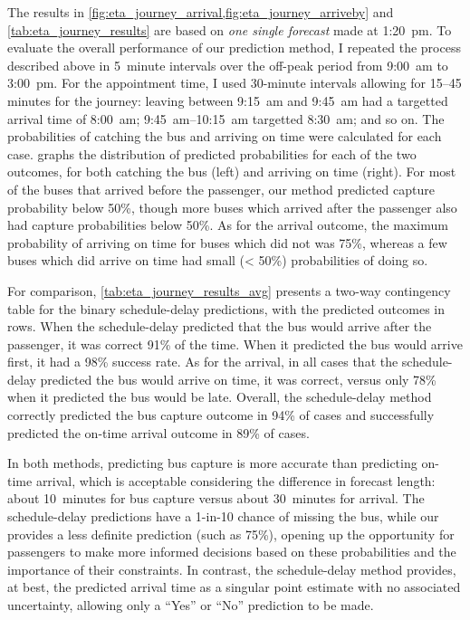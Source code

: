 The results in \cref{fig:eta_journey_arrival,fig:eta_journey_arriveby} and \cref{tab:eta_journey_results} are based on \emph{one single forecast} made at  1:20~pm. To evaluate the overall performance of our prediction method, I repeated the process described above in 5~minute intervals over the off-peak period from  9:00~am to  3:00~pm. For the appointment time, I used 30-minute intervals allowing for 15--45 minutes for the journey: leaving between 9:15~am and 9:45~am had a targetted arrival time of 8:00~am; 9:45~am--10:15~am targetted 8:30~am; and so on. The probabilities of catching the bus and arriving on time were calculated for each case.  graphs the distribution of predicted probabilities for each of the two outcomes, for both catching the bus (left) and arriving on time (right). For most of the buses that arrived before the passenger, our method predicted capture probability below 50\%, though more buses which arrived after the passenger also had capture probabilities below 50\%. As for the arrival outcome, the maximum probability of arriving on time for buses which did not was 75\%, whereas a few buses which did arrive on time had small (< 50\%) probabilities of doing so.


For comparison, \cref{tab:eta_journey_results_avg} presents a two-way contingency table for the binary schedule-delay predictions, with the predicted outcomes in rows. When the schedule-delay predicted that the bus would arrive after the passenger, it was correct 91\% of the time. When it predicted the bus would arrive first, it had a 98\% success rate. As for the arrival, in all cases that the schedule-delay predicted the bus would arrive on time, it was correct, versus only 78\% when it predicted the bus would be late. Overall, the schedule-delay method correctly predicted the bus capture outcome in 94\% of cases and successfully predicted the on-time arrival outcome in 89\% of cases.


In both methods, predicting bus capture is more accurate than predicting on-time arrival, which is acceptable considering the difference in forecast length: about 10~minutes for bus capture versus about 30~minutes for arrival. The schedule-delay predictions have a 1-in-10 chance of missing the bus, while our \pf{} provides a less definite prediction (such as 75\%), opening up the opportunity for passengers to make more informed decisions based on these probabilities and the importance of their constraints. In contrast, the schedule-delay method provides, at best, the predicted arrival time as a singular point estimate with no associated uncertainty, allowing only a ``Yes'' or ``No'' prediction to be made.


